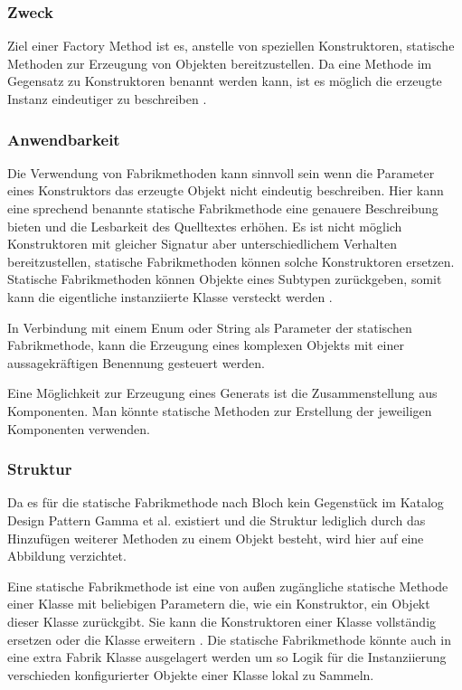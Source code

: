 \documentclass[12pt,oneside,a4paper,parskip]{scrbook}
\begin{document}
\subsubsection{Zweck}

Ziel einer Factory Method ist es, anstelle von speziellen Konstruktoren,  statische Methoden zur Erzeugung von Objekten bereitzustellen. Da eine Methode im Gegensatz zu Konstruktoren benannt werden kann, ist es möglich die erzeugte Instanz eindeutiger zu beschreiben \cite[S. 5f]{bloch2017}. 

\subsubsection{Anwendbarkeit}

Die Verwendung von Fabrikmethoden kann sinnvoll sein wenn die Parameter eines Konstruktors das erzeugte Objekt nicht eindeutig beschreiben. Hier kann eine sprechend benannte statische Fabrikmethode eine genauere Beschreibung bieten und die Lesbarkeit des Quelltextes erhöhen. Es ist nicht möglich Konstruktoren mit gleicher Signatur aber unterschiedlichem Verhalten bereitzustellen, statische Fabrikmethoden können solche Konstruktoren ersetzen. Statische Fabrikmethoden können Objekte eines Subtypen zurückgeben, somit kann die eigentliche instanziierte Klasse versteckt werden \cite[S. 5ff]{bloch2017}.

In Verbindung mit einem Enum oder String als Parameter der statischen Fabrikmethode, kann die Erzeugung eines komplexen Objekts mit einer aussagekräftigen Benennung gesteuert werden.

Eine Möglichkeit zur Erzeugung eines Generats ist die Zusammenstellung aus Komponenten. Man könnte statische Methoden zur Erstellung der jeweiligen Komponenten verwenden.

\subsubsection{Struktur}

Da es für die statische Fabrikmethode nach Bloch kein Gegenstück im Katalog Design Pattern Gamma et al. existiert \cite[S. 5]{bloch2017} und die Struktur lediglich durch das Hinzufügen weiterer Methoden zu einem Objekt besteht, wird hier auf eine Abbildung verzichtet. 

Eine statische Fabrikmethode ist eine von außen zugängliche statische Methode einer Klasse mit beliebigen Parametern die, wie ein Konstruktor, ein Objekt dieser Klasse zurückgibt. Sie kann die Konstruktoren einer Klasse vollständig ersetzen oder die Klasse erweitern \cite[S. 5f]{bloch2017}. Die statische Fabrikmethode könnte auch in eine extra Fabrik Klasse ausgelagert werden um so Logik für die Instanziierung verschieden konfigurierter Objekte einer Klasse lokal zu Sammeln.
\end{document}

